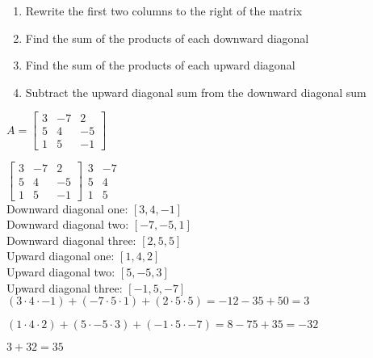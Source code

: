 \documentclass{report}
\begin{document}
\begin{enumerate}
    \item Rewrite the first two columns to the right of the matrix
    \item Find the sum of the products of each downward diagonal
    \item Find the sum of the products of each upward diagonal
    \item Subtract the upward diagonal sum from the downward diagonal sum
\end{enumerate}

 {
    $
        A=
        \begin{bmatrix}
            3 & -7 & 2 \\
            5 & 4 & -5 \\
            1 & 5 & -1
        \end{bmatrix}
    $

    $   
        \begin{bmatrix}
            3 & -7 & 2 \\
            5 & 4 & -5 \\
            1 & 5 & -1
        \end{bmatrix}
        \begin{matrix}
            3 & -7 \\
            5 & 4 \\
            1 & 5
        \end{matrix}
    $ \\

    Downward diagonal one: $[3,4,-1]$ \\
    Downward diagonal two: $[-7,-5,1]$ \\
    Downward diagonal three: $[2,5,5]$ \\
    
    Upward diagonal one: $[1,4,2]$ \\
    Upward diagonal two: $[5,-5,3]$ \\
    Upward diagonal three: $[-1,5,-7]$ \\

    $(3 \cdot 4 \cdot -1)+(-7 \cdot 5 \cdot 1)+(2 \cdot 5 \cdot 5)=-12-35+50=3$

    $(1 \cdot 4 \cdot 2)+(5 \cdot -5 \cdot 3)+(-1 \cdot 5 \cdot -7)=8-75+35=-32$

    $3+32=\boxed{35}$
}
\end{document}
